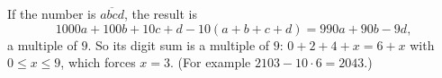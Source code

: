 If the number is $\overline{abcd}$, the result is
\[1000a+100b+10c+d-10(a+b+c+d)=990a+90b-9d,\]
a multiple of $9$. So its digit sum is a multiple of $9$: $0+2+4+x=6+x$ with $0\le x\le9$, which forces $x=\boxed{3}$. (For example $2103-10\cdot6=2043$.)
